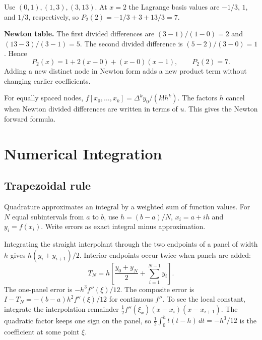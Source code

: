 \documentclass[12pt,a4paper]{article}
\begin{document}
\begin{tcolorbox}[examplebox, title={Unequal nodes: find the same value by two methods}]
Use $(0,1),(1,3),(3,13)$. At $x=2$ the Lagrange basis values are $-1/3$, $1$, and $1/3$, respectively, so $P_2(2)=-1/3+3+13/3=7$.

\textbf{Newton table.} The first divided differences are $(3-1)/(1-0)=2$ and $(13-3)/(3-1)=5$. The second divided difference is $(5-2)/(3-0)=1$. Hence
\[
P_2(x)=1+2(x-0)+(x-0)(x-1),\qquad P_2(2)=7.
\]
Adding a new distinct node in Newton form adds a new product term without changing earlier coefficients.
\end{tcolorbox}

\begin{tcolorbox}[masonbox, title={Difference table check}]
For equally spaced nodes, $f[x_0,\ldots,x_k]=\Delta^k y_0/(k!h^k)$. The factors $h$ cancel when Newton divided differences are written in terms of $u$. This gives the Newton forward formula.
\end{tcolorbox}

\section{Numerical Integration}
\subsection{Trapezoidal rule}
\begin{tcolorbox}[defbox, title={Quadrature and panel width}]
Quadrature approximates an integral by a weighted sum of function values. For $N$ equal subintervals from $a$ to $b$, use $h=(b-a)/N$, $x_i=a+ih$ and $y_i=f(x_i)$. Write errors as exact integral minus approximation.
\end{tcolorbox}

\begin{tcolorbox}[formulabox, title={Trapezoidal rule and error}]
Integrating the straight interpolant through the two endpoints of a panel of width $h$ gives $h(y_i+y_{i+1})/2$. Interior endpoints occur twice when panels are added:
\[
T_N=h\left[\frac{y_0+y_N}{2}+\sum_{i=1}^{N-1}y_i\right].
\]
The one-panel error is $-h^3 f''(\xi)/12$. The composite error is $I-T_N=-(b-a)h^2 f''(\xi)/12$ for continuous $f''$. To see the local constant, integrate the interpolation remainder $\tfrac12 f''(\xi_x)(x-x_i)(x-x_{i+1})$. The quadratic factor keeps one sign on the panel, so $\tfrac12\int_0^h t(t-h)\,dt=-h^3/12$ is the coefficient at some point $\xi$.
\end{tcolorbox}
\end{document}
